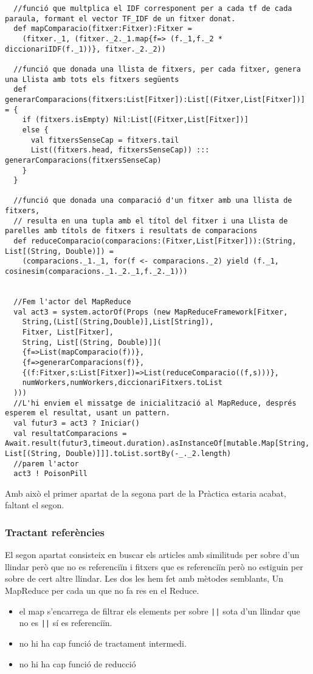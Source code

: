 \documentclass[11pt,a4paper,twoside]{report}
\begin{document}
\begin{lstlisting}
  //funció que multplica el IDF corresponent per a cada tf de cada paraula, formant el vector TF_IDF de un fitxer donat.
  def mapComparacio(fitxer:Fitxer):Fitxer =
    (fitxer._1, (fitxer._2._1.map{f=> (f._1,f._2 * diccionariIDF(f._1))}, fitxer._2._2))

  //funció que donada una llista de fitxers, per cada fitxer, genera una Llista amb tots els fitxers següents
  def generarComparacions(fitxers:List[Fitxer]):List[(Fitxer,List[Fitxer])] = {
    if (fitxers.isEmpty) Nil:List[(Fitxer,List[Fitxer])]
    else {
      val fitxersSenseCap = fitxers.tail
      List((fitxers.head, fitxersSenseCap)) ::: generarComparacions(fitxersSenseCap)
    }
  }

  //funció que donada una comparació d'un fitxer amb una llista de fitxers,
  // resulta en una tupla amb el títol del fitxer i una Llista de parelles amb títols de fitxers i resultats de comparacions
  def reduceComparacio(comparacions:(Fitxer,List[Fitxer])):(String, List[(String, Double)]) =
    (comparacions._1._1, for(f <- comparacions._2) yield (f._1, cosinesim(comparacions._1._2._1,f._2._1)))


  //Fem l'actor del MapReduce
  val act3 = system.actorOf(Props (new MapReduceFramework[Fitxer,
    String,(List[(String,Double)],List[String]),
    Fitxer, List[Fitxer],
    String, List[(String, Double)]](
    {f=>List(mapComparacio(f))},
    {f=>generarComparacions(f)},
    {(f:Fitxer,s:List[Fitxer])=>List(reduceComparacio((f,s)))},
    numWorkers,numWorkers,diccionariFitxers.toList
  )))
  //L'hi enviem el missatge de inicialització al MapReduce, després esperem el resultat, usant un pattern.
  val futur3 = act3 ? Iniciar()
  val resultatComparacions = Await.result(futur3,timeout.duration).asInstanceOf[mutable.Map[String, List[(String, Double)]]].toList.sortBy(-_._2.length)
  //parem l'actor
  act3 ! PoisonPill
\end{lstlisting}

Amb això el primer apartat de la segona part de la Pràctica estaria acabat, faltant el segon.

\subsubsection{Tractant referències}
El segon apartat consisteix en buscar els articles amb similituds per sobre d'un llindar però que no es referenciïn
i fitxers que es referenciïn però no estiguin per sobre de cert altre llindar. Les dos les hem fet amb mètodes semblants, Un MapReduce per cada un que no fa res en el Reduce.
\begin{itemize}
  \item el map s'encarrega de filtrar els elements per {sobre \texttt{||} sota} d'un llindar que {no es \texttt{||} sí es} referenciïn.
  \item no hi ha cap funció de tractament intermedi.
  \item no hi ha cap funció de reducció
\end{itemize}
\end{document}
